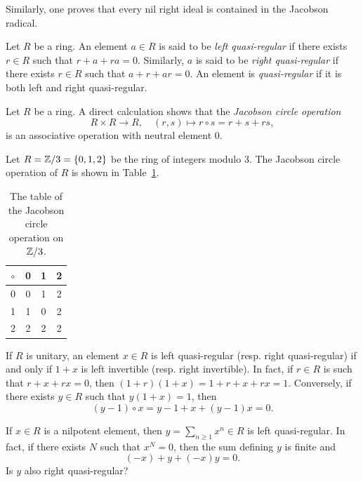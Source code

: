 Similarly, one proves that 
every nil right ideal is contained in the Jacobson radical. 


\begin{definition}
Let $R$ be a ring. An element $a\in R$ is said to be 
\emph{left quasi-regular} if there exists $r\in R$ such that $r+a+ra=0$. Similarly, 
$a$ is said to be \emph{right quasi-regular} if there exists $r\in R$ such that $a+r+ar=0$. An element is \emph{quasi-regular} if it is both left and right
quasi-regular.
\end{definition}

Let $R$ be a ring. A direct calculation shows that
the \emph{Jacobson circle operation}
\[
R\times R\to R,
\quad
(r,s)\mapsto r\circ s=r+s+rs,
\]
is an associative operation with neutral element $0$.

\begin{example}
Let $R=\mathbb{Z}/3=\{0,1,2\}$ be the ring of integers modulo 3. 
The Jacobson circle 
operation of $R$ is shown in Table~\ref{tab:radical}.
\end{example}

	\begin{table}[bht]
  		\caption{The table of the Jacobson circle operation on $\mathbb{Z}/3$.}
		\centering
		\begin{tabular}{c|ccc}
			$\circ$ & 0 & 1 & 2\tabularnewline
			\hline
			0 & 0 & 1 & 2\tabularnewline
			1 & 1 & 0 & 2\tabularnewline
			2 & 2 & 2 & 2\tabularnewline
		\end{tabular}
    \label{tab:radical}
 	\end{table}

If $R$ is unitary, an element $x\in R$ is left quasi-regular (resp. right
quasi-regular) if and only if $1+x$ is left invertible (resp. right
invertible). In fact, if $r\in R$ is such that $r+x+rx=0$, then
$(1+r)(1+x)=1+r+x+rx=1$.  Conversely, if there exists $y\in R$ such that
$y(1+x)=1$, then  
\[
(y-1)\circ x=y-1+x+(y-1)x=0.
\]

\begin{example}
	If $x\in R$ is a nilpotent element,
    then $y=\sum_{n\geq1}x^n\in R$ is left quasi-regular.
	In fact, if there exists $N$ such that $x^N=0$,
    then the sum defining $y$ is finite and
    \[
    (-x)+y+(-x)y=0.
    \]
    Is $y$ also right quasi-regular?
\end{example}

